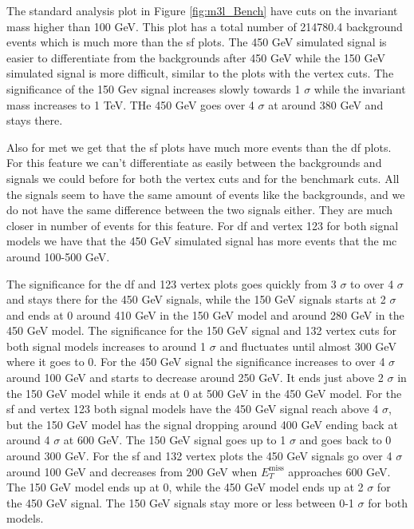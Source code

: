 \documentclass[a4paper, american, 12pt]{report}
\begin{document}
	The standard analysis plot in Figure \ref{fig:m3l_Bench} have cuts on the invariant mass higher than 100 GeV. This plot has a total number of 214780.4 background events which is much more than the \acrshort{sf} plots. The 450 GeV simulated signal is easier to differentiate from the backgrounds after 450 GeV while the 150 GeV simulated signal is more difficult, similar to the plots with the vertex cuts. The significance of the 150 Gev signal increases slowly towards 1 $\sigma$ while the invariant mass increases to 1 TeV. THe 450 GeV goes over 4 $\sigma$ at around 380 GeV and stays there.

	Also for \acrshort{met} we get that the \acrshort{sf} plots have much more events than the \acrshort{df} plots. For this feature we can't differentiate as easily between the backgrounds and signals we could before for both the vertex cuts and for the benchmark cuts. All the signals seem to have the same amount of events like the backgrounds, and we do not have the same difference between the two signals either. They are much closer in number of events for this feature. For \acrshort{df} and vertex 123 for both signal models we have that the 450 GeV simulated signal has more events that the \acrshort{mc} around 100-500 GeV. 
	
	The significance for the \acrshort{df} and 123 vertex plots goes quickly from 3 $\sigma$ to over 4 $\sigma$ and stays there for the 450 GeV signals, while the 150 GeV signals starts at 2 $\sigma$ and ends at 0 around 410 GeV in the 150 GeV model and around 280 GeV in the 450 GeV model. The significance for the 150 GeV signal and 132 vertex cuts for both signal models increases to around 1 $\sigma$ and fluctuates until almost 300 GeV where it goes to 0. For the 450 GeV signal the significance increases to over 4 $\sigma$ around 100 GeV and starts to decrease around 250 GeV. It ends just above 2 $\sigma$ in the 150 GeV model while it ends at 0 at 500 GeV in the 450 GeV model. For the \acrshort{sf} and vertex 123 both signal models have the 450 GeV signal reach above 4 $\sigma$, but the 150 GeV model has the signal dropping around 400 GeV ending back at around 4 $\sigma$ at 600 GeV. The 150 GeV signal goes up to 1 $\sigma$ and goes back to 0 around 300 GeV. For the \acrshort{sf} and 132 vertex plots the 450 GeV signals go over 4 $\sigma$ around 100 GeV and decreases from 200 GeV when $E_T^{\text{miss}}$ approaches 600 GeV. The 150 GeV model ends up at 0, while the 450 GeV model ends up at 2 $\sigma$ for the 450 GeV signal. The 150 GeV signals stay more or less between 0-1 $\sigma$ for both models.
	
\end{document}
